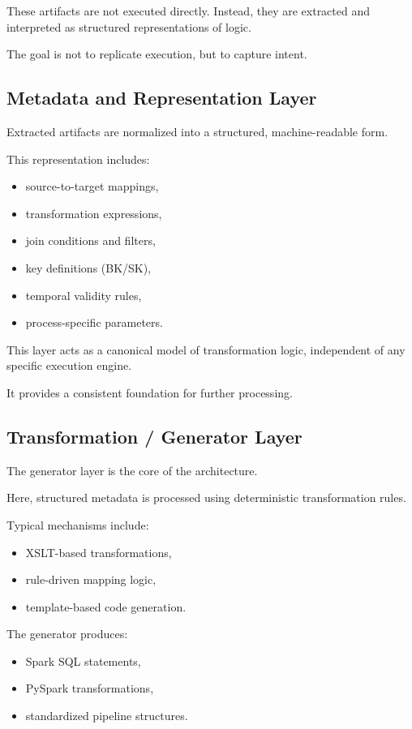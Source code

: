 \documentclass[11pt,a4paper]{article}
\begin{document}
These artifacts are not executed directly. Instead, they are extracted and interpreted as structured representations of logic.

The goal is not to replicate execution, but to capture intent.

\subsection{Metadata and Representation Layer}

Extracted artifacts are normalized into a structured, machine-readable form.

This representation includes:
\begin{itemize}
  \item source-to-target mappings,
  \item transformation expressions,
  \item join conditions and filters,
  \item key definitions (BK/SK),
  \item temporal validity rules,
  \item process-specific parameters.
\end{itemize}

This layer acts as a canonical model of transformation logic, independent of any specific execution engine.

It provides a consistent foundation for further processing.

\subsection{Transformation / Generator Layer}

The generator layer is the core of the architecture.

Here, structured metadata is processed using deterministic transformation rules.

Typical mechanisms include:
\begin{itemize}
  \item XSLT-based transformations,
  \item rule-driven mapping logic,
  \item template-based code generation.
\end{itemize}

The generator produces:
\begin{itemize}
  \item Spark SQL statements,
  \item PySpark transformations,
  \item standardized pipeline structures.
\end{itemize}
\end{document}
